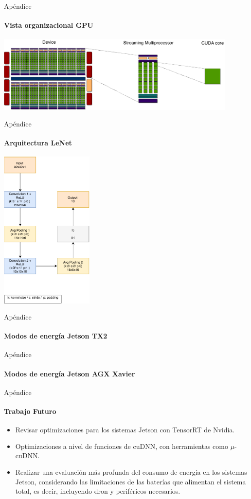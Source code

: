 \begin{frame}[noframenumbering]{Apéndice}

\framesubtitle{Vista organizacional GPU}
\centering
\includegraphics[width=0.9\textwidth]{fig/GPU-diagram1.pdf}

\end{frame}
\begin{frame}[noframenumbering]{Apéndice}
\framesubtitle{Arquitectura LeNet}

\centering
\includegraphics[width=0.35\textwidth]{anexo/lenet.pdf}

\end{frame}
\begin{frame}[noframenumbering]{Apéndice}
\framesubtitle{Modos de energía Jetson TX2}
\centering
\resizebox{0.9\linewidth}{!}{

}

\end{frame}


\begin{frame}[noframenumbering]{Apéndice}
\framesubtitle{Modos de energía Jetson AGX Xavier}
\centering
\resizebox{0.9\linewidth}{!}{

}
\end{frame}

\begin{frame}[noframenumbering]{Apéndice}
\framesubtitle{Trabajo Futuro}

\begin{itemize}
    \item Revisar optimizaciones para los sistemas Jetson con TensorRT de Nvidia. 
    \item Optimizaciones a nivel de funciones de cuDNN, con herramientas como $\mu$-cuDNN. 
     \item Realizar una evaluación más profunda del consumo de energía en los sistemas Jetson, considerando las limitaciones de las baterías que alimentan el sistema total, es decir, incluyendo dron y periféricos necesarios.
\end{itemize}
\end{frame}


